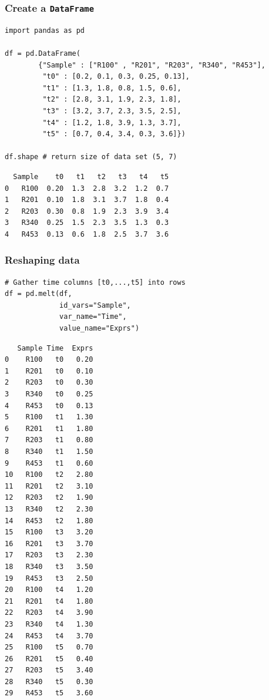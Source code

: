 \documentclass[pdf]{beamer}
\begin{document}
\begin{frame}[fragile]
\frametitle{Create a \texttt{DataFrame}}

\begin{lstlisting}[style=python]
import pandas as pd

df = pd.DataFrame(
        {"Sample" : ["R100" , "R201", "R203", "R340", "R453"],
         "t0" : [0.2, 0.1, 0.3, 0.25, 0.13], 
         "t1" : [1.3, 1.8, 0.8, 1.5, 0.6],
         "t2" : [2.8, 3.1, 1.9, 2.3, 1.8],
         "t3" : [3.2, 3.7, 2.3, 3.5, 2.5],
         "t4" : [1.2, 1.8, 3.9, 1.3, 3.7],
         "t5" : [0.7, 0.4, 3.4, 0.3, 3.6]})

df.shape # return size of data set (5, 7)
\end{lstlisting}

\vspace{-0.8cm}

\footnotesize
\begin{verbatim}
  Sample    t0   t1   t2   t3   t4   t5
0   R100  0.20  1.3  2.8  3.2  1.2  0.7
1   R201  0.10  1.8  3.1  3.7  1.8  0.4
2   R203  0.30  0.8  1.9  2.3  3.9  3.4
3   R340  0.25  1.5  2.3  3.5  1.3  0.3
4   R453  0.13  0.6  1.8  2.5  3.7  3.6
\end{verbatim}
\normalsize

\end{frame}

\begin{frame}[fragile]
\frametitle{Reshaping data}

\begin{lstlisting}[style=python]
# Gather time columns [t0,...,t5] into rows
df = pd.melt(df, 
             id_vars="Sample", 
             var_name="Time",
             value_name="Exprs")
\end{lstlisting}

\vspace{-0.8cm}

{\fontsize{5}{5}\selectfont
\begin{verbatim}
   Sample Time  Exprs
0    R100   t0   0.20
1    R201   t0   0.10
2    R203   t0   0.30
3    R340   t0   0.25
4    R453   t0   0.13
5    R100   t1   1.30
6    R201   t1   1.80
7    R203   t1   0.80
8    R340   t1   1.50
9    R453   t1   0.60
10   R100   t2   2.80
11   R201   t2   3.10
12   R203   t2   1.90
13   R340   t2   2.30
14   R453   t2   1.80
15   R100   t3   3.20
16   R201   t3   3.70
17   R203   t3   2.30
18   R340   t3   3.50
19   R453   t3   2.50
20   R100   t4   1.20
21   R201   t4   1.80
22   R203   t4   3.90
23   R340   t4   1.30
24   R453   t4   3.70
25   R100   t5   0.70
26   R201   t5   0.40
27   R203   t5   3.40
28   R340   t5   0.30
29   R453   t5   3.60
\end{verbatim}}

\end{frame}
\end{document}
